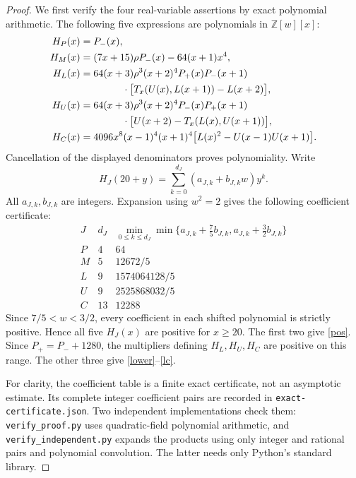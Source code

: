 \documentclass[11pt]{article}
\begin{document}
\begin{proof}
We first verify the four real-variable assertions by exact polynomial
arithmetic. The following five expressions are polynomials in
\(\mathbb Z[w][x]\):
\begin{align*}
 H_P(x)&=P_-(x),\\
 H_M(x)&=(7x+15)\rho P_-(x)-64(x+1)x^4,\\
 H_L(x)&=64(x+3)\rho^3(x+2)^4P_+(x)P_-(x+1)\\
 &\hspace{15mm}\cdot\bigl[T_x(U(x),L(x+1))-L(x+2)\bigr],\\
 H_U(x)&=64(x+3)\rho^3(x+2)^4P_-(x)P_+(x+1)\\
 &\hspace{15mm}\cdot\bigl[U(x+2)-T_x(L(x),U(x+1))\bigr],\\
 H_C(x)&=4096x^8(x-1)^4(x+1)^4
                  \bigl[L(x)^2-U(x-1)U(x+1)\bigr].
\end{align*}
Cancellation of the displayed denominators proves polynomiality.
Write
\[
 H_J(20+y)=\sum_{k=0}^{d_J}(a_{J,k}+b_{J,k}w)y^k.
\]
All \(a_{J,k},b_{J,k}\) are integers. Expansion using \(w^2=2\) gives
the following coefficient certificate:
\[
\begin{array}{c|r|r}
 J&d_J&
 \displaystyle\min_{0\le k\le d_J}
 \min\{a_{J,k}+\tfrac75b_{J,k},
       a_{J,k}+\tfrac32b_{J,k}\}\\ \hline
 P&4&64\\
 M&5&12672/5\\
 L&9&1574064128/5\\
 U&9&2525868032/5\\
 C&13&12288
\end{array}
\]
Since \(7/5<w<3/2\), every coefficient in each shifted polynomial is
strictly positive. Hence all five \(H_J(x)\) are positive for \(x\ge20\).
The first two give \eqref{pos}. Since \(P_+=P_-+1280\), the multipliers
defining \(H_L,H_U,H_C\) are positive on this range. The other three
give \eqref{lower}--\eqref{lc}.

For clarity, the coefficient table is a finite exact certificate,
not an asymptotic estimate. Its complete integer coefficient pairs
are recorded in \texttt{exact-certificate.json}.
Two independent implementations check them:
\texttt{verify\_proof.py} uses quadratic-field polynomial arithmetic,
and \texttt{verify\_independent.py} expands the products using only
integer and rational pairs and polynomial convolution.
The latter needs only Python's standard library.


\end{proof}
\end{document}
